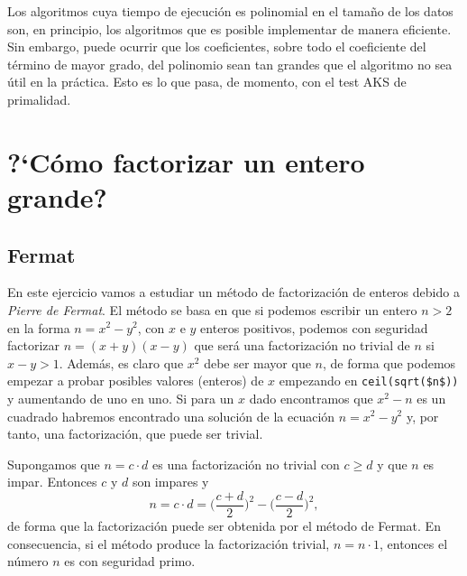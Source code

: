 Los algoritmos cuya tiempo 
de ejecuci\'on es polinomial en el tama\~no de los datos son, en principio, los 
algoritmos que es posible implementar de manera eficiente. Sin embargo, puede 
ocurrir que los coeficientes, sobre todo el coeficiente del t\'ermino de mayor 
grado,  del polinomio sean tan grandes que el algoritmo no sea \'util en la  
pr\'actica. Esto es lo que pasa, de momento, con el test AKS de primalidad. 







\section{?`C\'omo factorizar un entero grande?}

\subsection{Fermat}

En este ejercicio vamos a estudiar un m\'etodo de factorizaci\'on de
enteros debido a {\itshape Pierre de Fermat}. El m\'etodo se basa en que si
podemos escribir un entero $n>2$ en la forma $n=x^2-y^2$, con $x$ e $y$ enteros
positivos, podemos con seguridad factorizar $n=(x+y)(x-y)$ que ser\'a una
factorizaci\'on no trivial de $n$ si $x-y>1.$ Adem\'as,  es claro que $x^2$ debe
ser mayor que $n$, de forma que podemos empezar a probar posibles valores
(enteros) de $x$
 empezando en \lstinline|ceil(sqrt($n$))| y aumentando de uno en uno. Si para un 
$x$
dado encontramos que $x^2-n$
es un cuadrado habremos encontrado una soluci\'on de la ecuaci\'on $n=x^2-y^2$
y, por tanto, una factorizaci\'on, que puede ser trivial.

Supongamos que $n=c\cdot d$ es una factorizaci\'on no trivial con $c\ge d$ y que
$n$ es impar. Entonces $c$ y $d$ son impares y 
\[n=c\cdot d=\Big(\frac{c+d}{2}\Big)^2-\Big(\frac{c-d}{2}\Big)^2,\]
\noindent de forma que la factorizaci\'on puede ser obtenida por el m\'etodo de
Fermat. En consecuencia, si el m\'etodo produce la factorizaci\'on trivial,
$n=n\cdot 1$, entonces el n\'umero $n$ es con seguridad primo.

\

\pagebreak[3]

